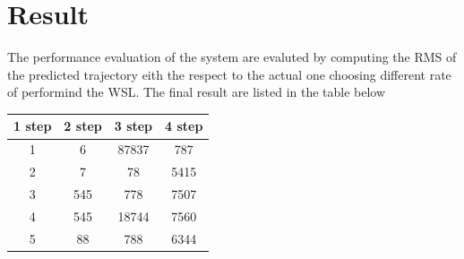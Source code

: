\documentclass[twocolumn]{article}
\begin{document}
    \section*{Result}
    The performance evaluation of the system are evaluted by computing the RMS of the predicted trajectory eith the respect to the actual one
    choosing different rate of performind the WSL. The final result are listed in the table below


    \begin{center}
        \begin{tabular}{||c c c c||}
            \hline
            1 step & 2 step & 3 step & 4 step \\ [0.5ex]
            \hline\hline
            1      & 6      & 87837  & 787    \\
            \hline
            2      & 7      & 78     & 5415   \\
            \hline
            3      & 545    & 778    & 7507   \\
            \hline
            4      & 545    & 18744  & 7560   \\
            \hline
            5      & 88     & 788    & 6344   \\ [1ex]
            \hline
        \end{tabular}
    \end{center}


    \subsection*{}
\end{document}
